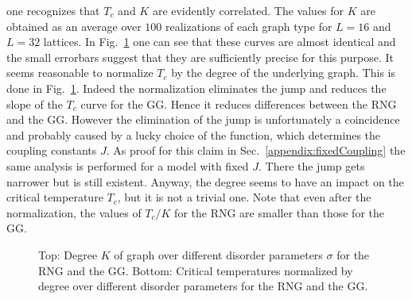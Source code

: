         one recognizes that \(T_c\) and \(K\) are evidently correlated.
        The values for \(K\) are obtained as an average over \(100\)
        realizations of each graph type for \(L=16\) and \(L=32\) lattices.
        In Fig.\ \ref{fig:Tc_deg}
        one can see that these curves are almost identical and the small
        errorbars suggest that they are sufficiently precise for this purpose.
        It seems reasonable to normalize \(T_c\) by the degree of the underlying
        graph. This is done in Fig.\ \ref{fig:Tc_deg}.
        Indeed the normalization eliminates the jump and reduces the
        slope of the \(T_c\) curve for the GG. Hence it reduces differences
        between the RNG and the GG. However the elimination of the jump is
        unfortunately a coincidence and probably caused by a lucky choice of the
        function, which determines the coupling constants \(J\). As proof for
        this claim in Sec.\ \ref{appendix:fixedCoupling} the same analysis
        is performed for a model with fixed \(J\). There the jump gets narrower
        but is still existent. Anyway, the degree seems to have an impact on
        the critical temperature \(T_c\), but it is not a trivial one.
        Note that even after the normalization, the values of \(T_c / K\)
        for the RNG are smaller than those for the GG.
        \begin{figure}[htbp]
            \centering


            \caption[Critical Temperature Normalized by Degree of the Graph]
            {
                Top: Degree \(K\) of graph over different
                disorder parameters \(\sigma\) for
                 the RNG and
                 the GG.
                Bottom: Critical temperatures normalized by degree over different
                disorder parameters for
                 the RNG and
                 the GG.
            }
            \label{fig:Tc_deg}
        \end{figure}\\
